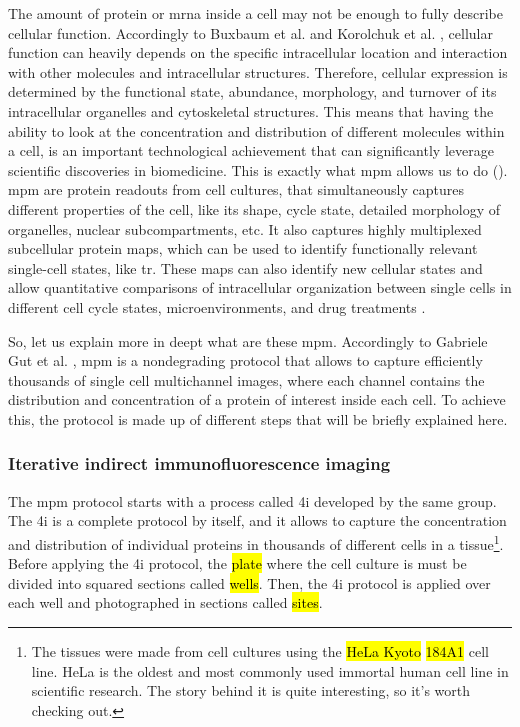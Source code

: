 
\glsresetall

\graphicspath{{./Sections/Dataset/Resources/}}

The amount of protein or \gls{mrna} inside a cell may not be enough to fully describe cellular function. Accordingly to Buxbaum et al. \cite{Buxbaum_2014} and Korolchuk et al. \cite{Korolchuk2011}, cellular function can heavily depends on the specific intracellular location and interaction with other molecules and intracellular structures. Therefore, cellular expression is determined by the functional state, abundance, morphology, and turnover of its intracellular organelles and cytoskeletal structures. This means that having the ability to look at the concentration and distribution of different molecules within a cell, is an important technological achievement that can significantly leverage scientific discoveries in biomedicine.
This is exactly what \gls{mpm} allows us to do (\cite{Guteaar7042}). \gls{mpm} are protein readouts from cell cultures, that simultaneously captures different properties of the cell, like its shape, cycle state, detailed morphology of organelles, nuclear subcompartments, etc. It also captures highly multiplexed subcellular protein maps, which can be used to identify functionally relevant single-cell states, like \gls{tr}. These maps can also identify new cellular states and allow quantitative comparisons of intracellular organization between single cells in different cell cycle states, microenvironments, and drug treatments \cite{Guteaar7042}.

So, let us explain more in deept what are these \gls{mpm}. Accordingly to Gabriele Gut et al. \cite{Guteaar7042}, \gls{mpm} is a nondegrading protocol that allows to capture efficiently thousands of single cell multichannel images, where each channel contains the distribution and concentration of a protein of interest inside each cell. To achieve this, the protocol is made up of different steps that will be briefly explained here.

\subsubsection{Iterative indirect immunofluorescence imaging}
The \gls{mpm} protocol starts with a process called \gls{4i} developed by the same group. The \gls{4i} is a complete protocol by itself, and it allows to capture the concentration and distribution of individual proteins in thousands of different cells in a tissue\footnote{The tissues were made from cell cultures using the \hl{HeLa Kyoto} \hl{184A1} cell line. HeLa is the oldest and most commonly used immortal human cell line in scientific research. The story behind it is quite interesting, so it's worth checking out.}.
Before applying the \gls{4i} protocol, the \hl{plate} where the cell culture is must be divided into squared sections called \hl{wells}. Then, the \gls{4i} protocol is applied over each well and photographed in sections called \hl{sites}.

